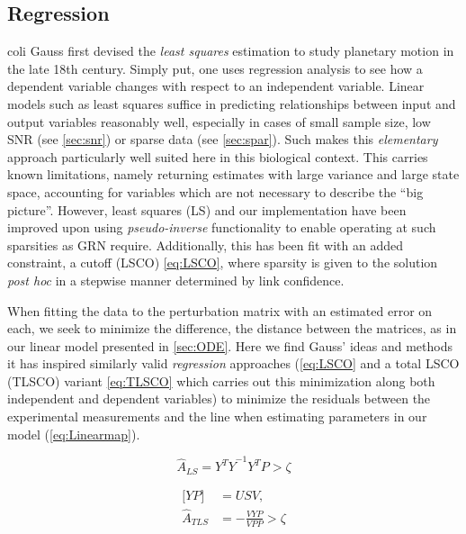 \subsection{Regression}coli
\label{sec:regress}
Gauss first devised the \emph{least squares} estimation to study planetary motion in the late 18th century. Simply put, one uses regression analysis to see how a dependent variable changes with respect to an independent variable. Linear models such as least squares suffice in predicting relationships between input and output variables reasonably well, especially in cases of small sample size, low SNR (see \cref{sec:snr}) or sparse data (see \cref{sec:spar})\citep{friedman2001elements}. Such makes this \emph{elementary} approach particularly well suited here in this biological context. This carries known limitations, namely returning estimates with large variance and large state space, \ie accounting for variables which are not necessary to describe the ``big picture''\citep[p.57]{friedman2001elements}. However, least squares (LS) and our implementation have been improved upon using \emph{pseudo-inverse} functionality \citep{carlson1974generalization} to enable operating at such sparsities as GRN require. Additionally, this has been fit with an added constraint, a cutoff (LSCO) \cref{eq:LSCO}, where sparsity is given to the solution \emph{post hoc} in a stepwise manner determined by link confidence.

When fitting the data to the perturbation matrix with an estimated error on each, we seek to minimize the difference, the distance between the matrices, as in our linear model presented in \cref{sec:ODE}. Here we find Gauss' ideas and methods it has inspired similarly valid \emph{regression} approaches (\cref{eq:LSCO} and a total LSCO (TLSCO) variant \cref{eq:TLSCO} \citep{de1998introduction} which carries out this minimization along both independent and dependent variables) to minimize the residuals between the experimental measurements and the line when estimating parameters in our model (\cref{eq:Linearmap}).

  \begin{equation}
       \hat{A}_{LS}={{Y^TY}^{-1} Y^TP} > \zeta
 \label{eq:LSCO}
 \end{equation}

\begin{equation}
  \begin{aligned}
    \lbrack Y P\rbrack &= U S V , \\
    \hat{A}_{TLS} &= -\frac{VYP}{VPP} > \zeta
 \label{eq:TLSCO}
 \end{aligned}
 \end{equation}

